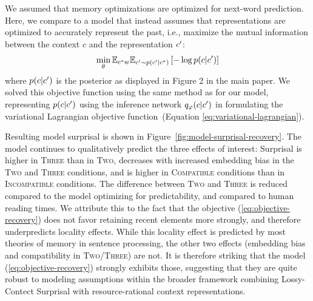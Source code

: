 We assumed that memory optimizations are optimized for next-word prediction.
Here, we compare to a model that instead assumes that representations are optimized to accurately represent the past, i.e., maximize the mutual information between the context $c$ and the representation $c'$:
\begin{equation}\label{eq:objective-recovery}
	\min_\theta \mathbb{E}_{c^*w} \mathbb{E}_{c' \sim p(c'|c^*)} \left[- \log p(c|c')\right]
\end{equation}
where $p(c|c')$ is the posterior as displayed in Figure 2 in the main paper.
We solved this objective function using the same method as for our model, representing $p(c|c')$ using the inference network $q_\varphi(c|c')$ in formulating the variational Lagrangian objective function~(Equation \ref{eq:variational-lagrangian}).

Resulting model surprisal is shown in Figure~\ref{fig:model-surprisal-recovery}.
The model continues to qualitatively predict the three effects of interest: Surprisal is higher in \textsc{Three} than in \textsc{Two}, decreases with increased embedding bias in the \textsc{Two} and \textsc{Three} conditions, and is higher in  \textsc{Compatible} conditions than in \textsc{Incompatible} conditions.
The difference between \textsc{Two} and \textsc{Three} is reduced compared to the model optimizing for predictability, and compared to human reading times. We attribute this to the fact that the objective (\ref{eq:objective-recovery}) does not favor retaining recent elements more strongly, and therefore underpredicts locality effects.
While this locality effect is predicted by most theories of memory in sentence processing, the other two effects (embedding bias and compatibility in \textsc{Two}/\textsc{Three}) are not. It is therefore striking that the model (\ref{eq:objective-recovery}) strongly exhibits those, suggesting that they are quite robust to modeling assumptions within the broader framework combining Lossy-Contect Surprisal with resource-rational context representations.

